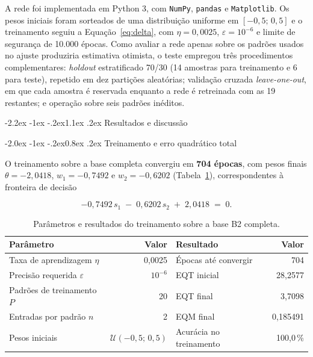 \documentclass[12pt,a4paper]{article}
\makeatletter
\renewcommand\section{\@startsection{section}{1}{\z@}%
  {-2.2ex \@plus -1ex \@minus -.2ex}{1.1ex \@plus .2ex}%
  {\normalfont\large\bfseries}}
\renewcommand\subsection{\@startsection{subsection}{2}{\z@}%
  {-2.0ex \@plus -1ex \@minus -.2ex}{0.8ex \@plus .2ex}%
  {\normalfont\normalsize\bfseries}}
\makeatother
\begin{document}
A rede foi implementada em Python 3, com \texttt{NumPy}, \texttt{pandas} e
\texttt{Matplotlib}. Os pesos iniciais foram sorteados de uma distribui\c{c}\~ao
uniforme em $[-0{,}5;\,0{,}5]$ e o treinamento seguiu a
Equa\c{c}\~ao~\ref{eq:delta}, com $\eta = 0{,}0025$, $\varepsilon = 10^{-6}$ e
limite de seguran\c{c}a de 10.000 \'epocas. Como avaliar a rede apenas sobre os
padr\~oes usados no ajuste produziria estimativa otimista, o teste empregou tr\^es
procedimentos complementares: \textit{holdout} estratificado 70/30 (14 amostras
para treinamento e 6 para teste), repetido em dez parti\c{c}\~oes aleat\'orias;
valida\c{c}\~ao cruzada \textit{leave-one-out}, em que cada amostra \'e reservada
enquanto a rede \'e retreinada com as 19 restantes; e opera\c{c}\~ao sobre seis
padr\~oes in\'editos.

\section{Resultados e discuss\~ao}
\label{sec:res}

\subsection{Treinamento e erro quadr\'atico total}

O treinamento sobre a base completa convergiu em \textbf{704 \'epocas}, com pesos
finais $\theta = -2{,}0418$, $w_1 = -0{,}7492$ e $w_2 = -0{,}6202$
(Tabela~\ref{tab:treino}), correspondentes \`a fronteira de decis\~ao

\begin{equation}
-0{,}7492\,s_1 \;-\; 0{,}6202\,s_2 \;+\; 2{,}0418 \;=\; 0 .
\label{eq:fronteira}
\end{equation}

\begin{table}[H]
\centering
\caption{Par\^ametros e resultados do treinamento sobre a base B2 completa.}
\label{tab:treino}
{\small\singlespacing
\begin{tabular}{@{}lr@{\hskip 1.0cm}lr@{}}
\toprule
\textbf{Par\^ametro} & \textbf{Valor} & \textbf{Resultado} & \textbf{Valor} \\
\midrule
Taxa de aprendizagem $\eta$ & 0,0025 & \'Epocas at\'e convergir & 704 \\
Precis\~ao requerida $\varepsilon$ & $10^{-6}$ & EQT inicial & 28,2577 \\
Padr\~oes de treinamento $P$ & 20 & EQT final & 3,7098 \\
Entradas por padr\~ao $n$ & 2 & EQM final & 0,185491 \\
Pesos iniciais & $\mathcal{U}(-0{,}5;\,0{,}5)$ & Acur\'acia no treinamento & 100,0\,\% \\
\bottomrule
\end{tabular}}
\end{table}
\end{document}
